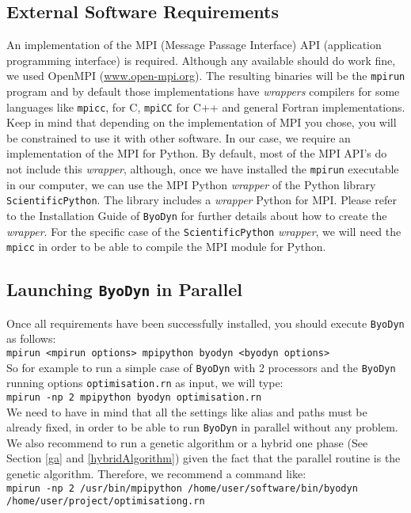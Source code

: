 \documentclass[a4paper, 11pt]{article}
\begin{document}
\subsection{External  Software Requirements}
An implementation of the MPI (Message Passage Interface) API (application programming interface) is required. 
Although any available should do work fine, we used OpenMPI (\url{www.open-mpi.org}). 
The resulting binaries will be the \texttt{mpirun} program and by default those implementations have \emph{wrappers} compilers for some languages like \texttt{mpicc}, for C, \texttt{mpiCC} for C++ and general Fortran implementations.  
Keep in mind that depending on the implementation of MPI you chose, you will be constrained to use it with other software. 
In our case, we require an implementation of the MPI for Python. 
By default, most of the MPI API's do not include this \emph{wrapper}, although, once we have installed the \texttt{mpirun} executable in our computer, we can use the MPI Python \emph{wrapper} of the Python library \texttt{ScientificPython}. 
The library includes a \emph{wrapper} Python for MPI.
Please refer to the Installation Guide of \texttt{ByoDyn} for further details about how to create the \emph{wrapper}.
For the specific case of the \texttt{ScientificPython} \emph{wrapper}, we will need the \texttt{mpicc} in order to be able to compile the MPI module for Python.
\subsection{Launching \texttt{ByoDyn} in Parallel}
Once all requirements have been successfully installed, you should execute \texttt{ByoDyn} as follows:\\[2ex]
\texttt{mpirun <mpirun options> mpipython byodyn <byodyn options>}\\[2ex]
So for example to run a simple case of \texttt{ByoDyn} with 2 processors and the \texttt{ByoDyn} running options \texttt{optimisation.rn} as input, we will type:\\[2ex]
\texttt{mpirun -np 2 mpipython byodyn optimisation.rn}\\[2ex]
We need to have in mind that all the settings like alias and paths must be already fixed, in order to be able to run \texttt{ByoDyn} in parallel without any problem.
We also recommend to run a genetic algorithm or a hybrid one phase (See Section \ref{ga} and \ref{hybridAlgorithm}) given the fact that the parallel routine is the genetic algorithm.
Therefore, we recommend a command like:\\[2ex]
\texttt{mpirun -np 2 /usr/bin/mpipython /home/user/software/bin/byodyn\\ /home/user/project/optimisationg.rn}
\end{document}

